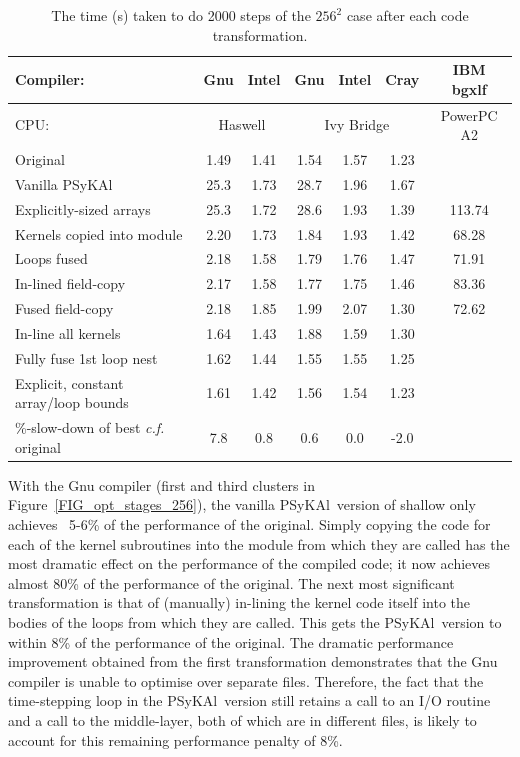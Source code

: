 \documentclass[journal]{IEEEtran}
\newcommand{\psykal}{{PS}y{KA}l\ }
\begin{document}
\begin{table}[!t]
\renewcommand{\arraystretch}{1.3}
\caption{The time (s) taken to do 2000 steps of the $256^2$ case after each 
code transformation.}
\label{TABLE_opt_breakdown}
\centering
\begin{tabular}{l|c|c|c|c|c|c}
\hline
Compiler:          &  Gnu    & Intel   & Gnu & Intel & Cray & IBM bgxlf \\
\hline
CPU:               & \multicolumn{2}{c|}{Haswell} & \multicolumn{3}{c|}{Ivy Bridge} & PowerPC A2 \\
\hline
Original                             & 1.49 & 1.41 & 1.54 & 1.57 & 1.23 &        \\
Vanilla \psykal                      & 25.3 & 1.73 & 28.7 & 1.96 & 1.67 &        \\
Explicitly-sized arrays              & 25.3 & 1.72 & 28.6 & 1.93 & 1.39 & 113.74 \\
Kernels copied into module           & 2.20 & 1.73 & 1.84 & 1.93 & 1.42 &  68.28 \\
Loops fused                          & 2.18 & 1.58 & 1.79 & 1.76 & 1.47 &  71.91 \\
In-lined field-copy                  & 2.17 & 1.58 & 1.77 & 1.75 & 1.46 &  83.36 \\
Fused field-copy                     & 2.18 & 1.85 & 1.99 & 2.07 & 1.30 &  72.62 \\
In-line all kernels                  & 1.64 & 1.43 & 1.88 & 1.59 & 1.30 &        \\
Fully fuse 1st loop nest             & 1.62 & 1.44 & 1.55 & 1.55 & 1.25 &        \\
Explicit, constant array/loop bounds & 1.61 & 1.42 & 1.56 & 1.54 & 1.23 &        \\
\hline
\parbox{2.5cm}{\%-slow-down of best {\it c.f.} original} & 7.8 & 0.8 & 0.6 & 0.0 & -2.0 &     \\
\hline
\end{tabular}
\end{table}

With the Gnu compiler (first and third clusters in
Figure~\ref{FIG_opt_stages_256}), the vanilla \psykal version of
shallow only achieves ~5-6\% of the performance of the
original. Simply copying the code for each of the kernel subroutines
into the module from which they are called has the most dramatic
effect on the performance of the compiled code; it now achieves almost
80\% of the performance of the original. The next most significant
transformation is that of (manually) in-lining the kernel code itself
into the bodies of the loops from which they are called. This gets the
\psykal version to within 8\% of the performance of the original.  The
dramatic performance improvement obtained from the first
transformation demonstrates that the Gnu compiler is unable to
optimise over separate files. Therefore, the fact that the
time-stepping loop in the \psykal version still retains a call to an
I/O routine and a call to the middle-layer, both of which are in
different files, is likely to account for this remaining performance
penalty of 8\%.
\end{document}
